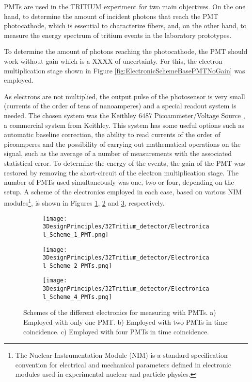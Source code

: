 PMTs are used in the TRITIUM experiment for two main objectives. On the one hand, to determine the amount of incident photons that reach the PMT photocathode, which is essential to characterize fibers, and, on the other hand, to measure the energy spectrum of tritium events in the laboratory prototypes.

To determine the amount of photons reaching the photocathode, the PMT should work without gain which is a XXXX of uncertainty. For this, the electron multiplication stage shown in Figure \ref{fig:ElectronicSchemeBasePMTNoGain} was employed. 

As electrons are not multiplied, the output pulse of the photosensor is very small (currents of the order of tens of nanoamperes) and a special readout system is needed. The chosen system was the Keithley 6487 Picoammeter/Voltage Source \cite{DataSheetKeithley6487}, a commercial system from Keithley. This system has some useful options such as automatic baseline correction, the ability to read currents of the order of picoamperes and the possibility of carrying out mathematical operations on the signal, such as the average of a number of measurements with the associated statistical error. To determine the energy of the events, the gain of the PMT was restored by removing the short-circuit of the electron multiplication stage. The number of PMTs used simultaneously was one, two or four, depending on the setup. A scheme of the electronics employed in each case, based on various NIM modules\footnote{The Nuclear Instrumentation Module (NIM) is a standard specification convention for electrical and mechanical parameters defined in electronic modules used in experimental nuclear and particle physics.}, is shown in Figures \ref{subfig:ElectronicConfiguraiton1PMT}, \ref{subfig:ElectronicConfiguraiton2PMT} and \ref{subfig:ElectronicConfiguraiton4PMT}, respectively.

\begin{figure}
\centering
    \begin{subfigure}[b]{1.0\textwidth}
    \centering
    \texttt{[image: 3DesignPrinciples/32Tritium\_detector/Electronical\_Scheme\_1\_PMT.png]}  
    \caption{\label{subfig:ElectronicConfiguraiton1PMT}}
    \end{subfigure}
    \hfill
    \begin{subfigure}[b]{1.0\textwidth}
    \centering
    \texttt{[image: 3DesignPrinciples/32Tritium\_detector/Electronical\_Scheme\_2\_PMTs.png]}  
    \caption{\label{subfig:ElectronicConfiguraiton2PMT}}
    \end{subfigure}
    \hfill
    \begin{subfigure}[b]{1.0\textwidth}
    \centering
    \texttt{[image: 3DesignPrinciples/32Tritium\_detector/Electronical\_Scheme\_4\_PMTs.png]}  
    \caption{\label{subfig:ElectronicConfiguraiton4PMT}}
    \end{subfigure}
 \caption{Schemes of the different electronics for measuring with PMTs. a) Employed with only one PMT. b) Employed with two PMTs in time coincidence. c) Employed with four PMTs in time coincidence.}
 \label{fig:ElectronicConfiguraitonsPMT}
\end{figure}

